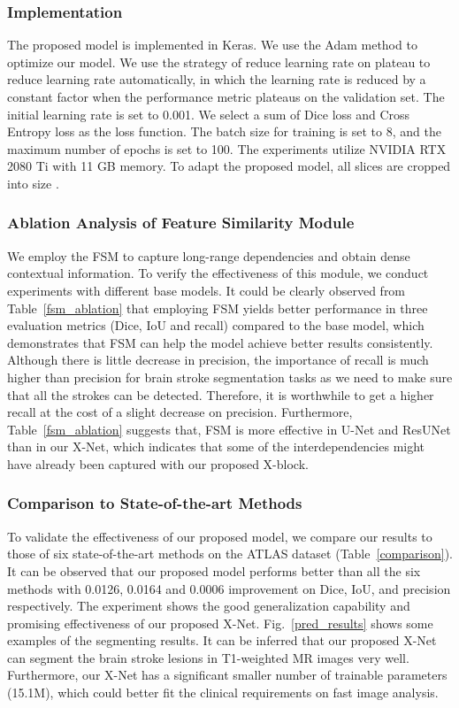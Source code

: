 \documentclass[runningheads]{llncs}
\begin{document}
\subsubsection{Implementation}
The proposed model is implemented in Keras. We use the Adam \cite{[23]} method to optimize our model.  We use the strategy of reduce learning rate on plateau to reduce learning rate automatically, in which the learning rate is reduced by a constant factor when the performance metric plateaus on the validation set. The initial learning rate is set to 0.001. We select a sum of Dice loss and Cross Entropy loss as the loss function. The batch size for training is set to 8, and the maximum number of epochs is set to 100. The experiments utilize NVIDIA RTX 2080 Ti with 11 GB memory. To adapt the proposed model, all slices are cropped into size . 

\subsubsection{Ablation Analysis of Feature Similarity Module}
We employ the FSM to capture long-range dependencies and obtain dense contextual information. To verify the effectiveness of this module, we conduct experiments with different base models. It could be clearly observed from Table~\ref{fsm_ablation} that employing FSM yields better performance in three evaluation metrics (Dice, IoU and recall) compared to the base model, which demonstrates that FSM can help the model achieve better results consistently. Although there is little decrease in precision, the importance of recall is much higher than precision for brain stroke segmentation tasks as we need to make sure that all the strokes can be detected. Therefore, it is worthwhile to get a higher recall at the cost of a slight decrease on precision. Furthermore, Table~\ref{fsm_ablation} suggests that, FSM is more effective in U-Net and ResUNet than in our X-Net, which indicates that some of the interdependencies might have already been captured with our proposed X-block. 



\subsubsection{Comparison to State-of-the-art Methods}
To validate the effectiveness of our proposed model, we compare our results to those of six state-of-the-art methods on the ATLAS dataset (Table~\ref{comparison}). It can be observed that our proposed model performs better than all the six methods with 0.0126, 0.0164 and 0.0006 improvement on Dice, IoU, and precision respectively. The experiment shows the good generalization capability and promising effectiveness of our proposed X-Net. Fig.~\ref{pred_results} shows some examples of the segmenting results. It can be inferred that our proposed X-Net can segment the brain stroke lesions in T1-weighted MR images very well. Furthermore, our X-Net has a significant smaller number of trainable parameters (15.1M), which could better fit the clinical requirements on fast image analysis.
\end{document}
